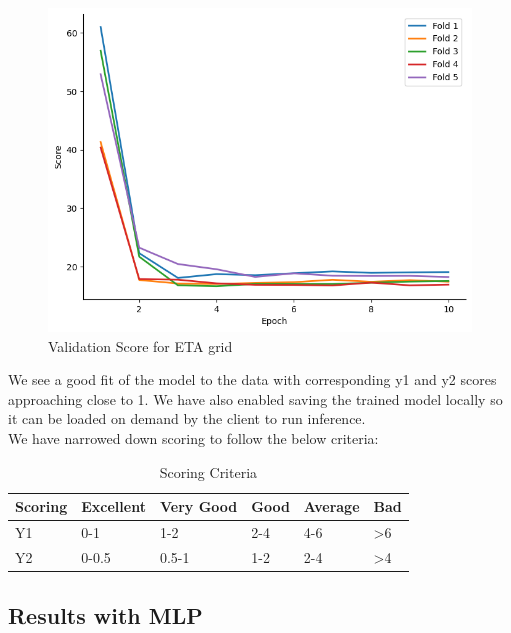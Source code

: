 \documentclass{report} %
\begin{document}
\begin{figure}[H]
\begin{minipage}[b]{0.3\textwidth}
        \includegraphics[width=\textwidth]{./ReportImages/val_score_y2.png}
        \caption{Validation Score for ETA grid}
        \label{fig:Validation Score for ETA grid}
    \end{minipage}
\end{figure}

We see a good fit of the model to the data with corresponding y1 and y2 scores approaching close to 1.
We have also enabled saving the trained model locally so it can be loaded on demand by the client to run inference.\\

We have narrowed down scoring to follow the below criteria:

\begin{table}[H]
    \centering
    \begin{tabularx}{1\linewidth}{|X|X|X|X|X|X|}
    \hline {\bf Scoring} & {\bf Excellent} & {\bf Very Good} & {\bf Good} & {\bf Average} & {\bf Bad}\\
    \hline 
    Y1 & 0-1 & 1-2 & 2-4 & 4-6 & \textgreater 6\\
    Y2 & 0-0.5 & 0.5-1 & 1-2 & 2-4 & \textgreater 4\\
    \hline
    \end{tabularx}
    \caption{Scoring Criteria}
\end{table}


\subsection*{Results with \ac{MLP}}
\end{document}
